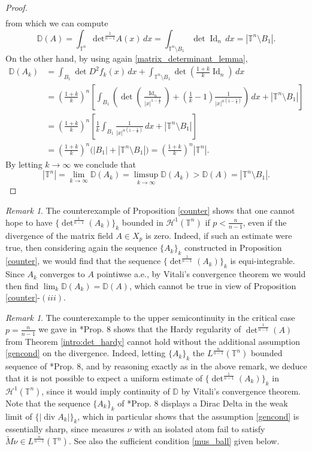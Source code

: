 \documentclass[10pt,reqno]{amsart}
\numberwithin{equation}{section}
\newcommand{\T}{\mathbb{T}}
\newcommand{\D}{\mathbb{D}}
\DeclareMathOperator{\Id}{Id}
\DeclareMathOperator{\dv}{div}
\theoremstyle{plain}
\theoremstyle{definition}
\theoremstyle{remark}
\newtheorem{rem}[Teo]{Remark}
\begin{document}
\begin{proof}
\begin{align*}
\end{align*}
from which we can compute 
$$
\D(A)=\int_{\T^n} \text{det}^{\frac{1}{n-1}} A(x)\,dx=\int_{\T^n\setminus B_1}\det \Id_n\,dx=|\T^n\setminus B_1|.
$$
On the other hand, by using again \eqref{matrix_determinant_lemma},
\begin{align*}
\D(A_k)&=\int_{B_1}\det D^2f_k(x)\,dx +\int_{\T^n\setminus B_1} \det \left(  \frac{1+k}{k}\Id_n \right) \,dx\\
&= \left( \frac{1+k}{k} \right)^n \left[ \int_{B_1} \left( \det\left( \frac{\Id_n}{|x|^{1-\frac{1}{k}}}\right)+\left(\frac{1}{k}-1 \right)\frac{1}{|x|^{n\left(1-\frac{1}{k}\right)}} \right) \,dx+|\T^n\setminus B_1| \right]\\
&=\left( \frac{1+k}{k} \right)^n\left[\frac{1}{k}\int_{B_1}\frac{1}{|x|^{n\left(1-\frac{1}{k}\right)}}\,dx  +|\T^n\setminus B_1|\right]\\
&=\left( \frac{1+k}{k} \right)^n\Big(|B_1|+|\T^n\setminus B_1| \Big) =\left( \frac{1+k}{k} \right)^n|\T^n| .
\end{align*}
By letting $k\rightarrow\infty$ we conclude that 
$$
|\T^n|=\lim_{k\rightarrow \infty}\D(A_k)=\limsup_{k\rightarrow\infty}\D(A_k) >\D(A)=|\T^n\setminus B_1|.
$$
\end{proof}

\begin{rem}\label{exp}
The counterexample of Proposition \ref{counter} shows that one cannot hope to have $\{{\det}^\frac{1}{n-1}(A_k)\}_k$  bounded in $\mathcal{H}^1(\T^n)$  if $p < \frac{n}{n- 1}$, even if the divergence of the matrix field $A \in X_p$ is zero. Indeed, if such an estimate were true, then considering again the sequence $\{A_k\}_k$ constructed in Proposition \ref{counter}, we would find that the sequence $\{{\det}^\frac{1}{n-1}(A_k)\}_k$ is equi-integrable. Since $A_k$ converges to $A$ pointiwse a.e., by Vitali's convergence theorem we would then find $\lim_k\D(A_k) = \D(A)$, which cannot be true in view of  Proposition \ref{counter}-$(iii)$. 
\end{rem}


\begin{rem}\label{rem_hardy_crit}
The counterexample to the upper semicontinuity in the critical case $p=\frac{n}{n-1}$ we gave in \cite{USC}*{Prop. 8} shows that the Hardy regularity of ${\det}^\frac{1}{n-1}(A)$ from Theorem \ref{intro:det_hardy} cannot hold without the additional assumption \eqref{gencond} on the divergence.  Indeed, letting $\{A_k\}_k$ the $L^\frac{n}{n-1}(\T^n)$ bounded sequence of \cite{USC}*{Prop. 8}, and by reasoning exactly as in the above remark, we deduce that it is not possible to expect a uniform estimate of $\{{\det}^\frac{1}{n-1}(A_k)\}_k$ in $\mathcal{H}^1(\T^n)$, since it would imply continuity of $\D$ by Vitali's convergence theorem.  Note that the sequence $\{A_k\}_k$ of \cite{USC}*{Prop. 8} displays a Dirac Delta in the weak limit of $\{|\dv A_k|\}_k$,  which in particular shows that the assumption \eqref{gencond} is essentially sharp, since measures $\nu$ with an isolated atom fail to satisfy  $\tilde M \nu\in L^\frac{n}{n-1}(\T^n)$. See also the sufficient condition \eqref{mus_ball} given below.
\end{rem}
\end{document}
